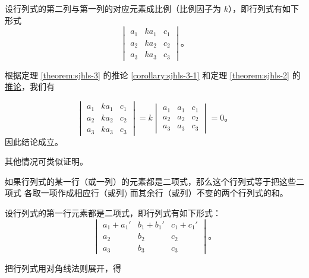 \zhengming 设行列式的第二列与第一列的对应元素成比例（比例因子为 $k$），即行列式有如下形式
$$
\begin{vmatrix*}
    a_1 & ka_1 & c_1 \\
    a_2 & ka_2 & c_2 \\
    a_3 & ka_3 & c_3
\end{vmatrix*} \text{。}
$$

根据定理 \ref{theorem:sjhls-3} 的推论 \ref{corollary:sjhls-3-1}
和定理 \ref{theorem:sjhls-2} 的 \hyperref[corollary:sjhls-2-1]{推论}，我们有

$$
\begin{vmatrix*}
    a_1 & ka_1 & c_1 \\
    a_2 & ka_2 & c_2 \\
    a_3 & ka_3 & c_3
\end{vmatrix*}
= k
\begin{vmatrix*}
    a_1 & a_1 & c_1 \\
    a_2 & a_2 & c_2 \\
    a_3 & a_3 & c_3
\end{vmatrix*}
= 0 \text{。}
$$
因此结论成立。

其他情况可类似证明。


\begin{theorem} \label{theorem:sjhls-5}
    如果行列式的某一行（或一列）的元素都是二项式，那么这个行列式等于把这些二项式
    各取一项作成相应行（或列) 而其余行（或列）不变的两个行列式的和。
\end{theorem}

\zhengming 设行列式的第一行元素都是二项式，即行列式有如下形式：
$$
\begin{vmatrix*}
    a_1 + a_1' & b_1 + b_1' & c_1 + c_1' \\
    a_2 & b_2 & c_2 \\
    a_3 & b_3 & c_3
\end{vmatrix*} \text{。}
$$

把行列式用对角线法则展开，得

